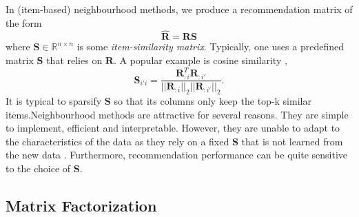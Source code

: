 \documentclass{article}
\newcommand{\citep}{\cite}
\newcommand{\Real}{\mathbb{R}}
\newcommand{\R}{\mathbf{R}}
\newcommand{\RHat}{\hat{\mathbf{R}}}
\newcommand{\Sim}{\mathbf{S}}
\newcommand{\numItems}{n}
\newcommand{\itemSet}{\mathcal{I}}
\renewcommand{\u}{u}
\renewcommand{\i}{i}
\newcommand{\ui}{\u\i}
\newcommand{\predUserItem}{\RHat_{\ui}}
\begin{document}
In (item-based) neighbourhood methods, we produce a recommendation matrix of the form
\begin{equation}
\label{eqn:knn}
\RHat = \R \Sim
\end{equation}
where $\Sim \in \Real^{\numItems \times \numItems}$ is some \emph{item-similarity matrix}.
Typically, one uses a predefined matrix $\Sim$ that relies on $\R$. A popular example is cosine similarity \citep{Sarwar:2001, Linden:2003},
$$ \Sim_{\i' \i} = \frac{ \R_{:\i}^T \R_{:\i'} }{|| \R_{:\i} ||_2 || \R_{:\i'} ||_2}. $$
It is typical to sparsify $\Sim$ so that its columns only keep the top-k similar items.Neighbourhood methods are attractive for several reasons.
They are simple to implement, efficient and interpretable. However, they are unable to adapt to the characteristics of the data as they rely on a fixed $\Sim$ that is not learned from the new data \citep{Koren:2008b}. Furthermore, recommendation performance can be quite sensitive to the choice of $\Sim$.

\subsection{Matrix Factorization}
\end{document}
